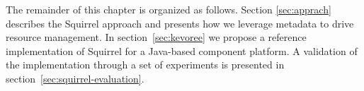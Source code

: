 The remainder of this chapter is organized as follows.
Section \ref{sec:apprach} describes the Squirrel approach and presents how we leverage metadata to drive resource management.
In section~\ref{sec:kevoree} we propose a reference implementation of Squirrel for a Java-based component platform.
A validation of the implementation through a set of experiments is presented in section~\ref{sec:squirrel-evaluation}.
